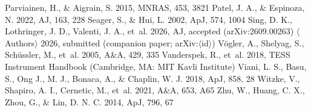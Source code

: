 \documentclass{aa}
\begin{document}
\begin{thebibliography}{}
 Parviainen, H., \& Aigrain, S. 2015, MNRAS, 453, 3821
 Patel, J. A., \& Espinoza, N. 2022, AJ, 163, 228
 Seager, S., \& Hui, L. 2002, ApJ, 574, 1004
 Sing, D. K., Lothringer, J. D., Valenti, J. A., et~al. 2026, AJ, accepted (arXiv:2609.00263)
 $\langle$Authors$\rangle$ 2026, submitted (companion paper; arXiv:$\langle$id$\rangle$)
 V{\"o}gler, A., Shelyag, S., Sch{\"u}ssler, M., et~al. 2005, A\&A, 429, 335
 Vanderspek, R., et~al. 2018, TESS Instrument Handbook (Cambridge, MA: MIT Kavli Institute)
 Viani, L. S., Basu, S., Ong J., M. J., Bonaca, A., \& Chaplin, W. J. 2018, ApJ, 858, 28
 Witzke, V., Shapiro, A. I., Cernetic, M., et~al. 2021, A\&A, 653, A65
 Zhu, W., Huang, C. X., Zhou, G., \& Lin, D. N. C. 2014, ApJ, 796, 67
\end{thebibliography}
\end{document}
